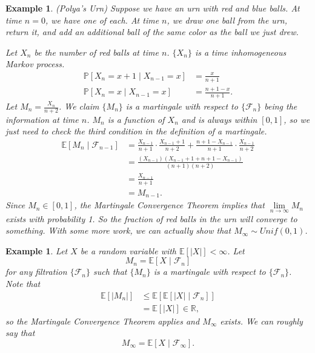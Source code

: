 \documentclass{tufte-handout}
\newcommand*\R{\mathbb{R}}
\newcommand*\E{\mathbb{E}}
\renewcommand*\P{\mathbb{P}}
\newtheorem{ex}[thm]{Example}
\theoremstyle{definition}
\begin{document}
\begin{ex}
	(Polya's Urn) Suppose we have an urn with red and blue balls. At time $n=0$, we have one of each. At time $n$, we draw one ball from the urn, return it, and add an additional ball of the same color as the ball we just drew.

	Let $X_n$ be the number of red balls at time $n$. $\{X_n\}$ is a time inhomogeneous Markov process. 
	\begin{align*}
		\P\left[X_n = x+1 \mid X_{n-1} = x\right] &= \frac{x}{n+1} \\
		\P\left[X_n = x \mid X_{n-1} = x\right] &= \frac{n+1-x}{n+1}
	.\end{align*}
	Let $M_n = \frac{X_n}{n+2}$. We claim $\{M_n\}$ is a martingale with respect to $\{\mathscr{F}_n\}$ being the information at time $n$.
	$M_n$ is a function of $X_n$ and is always within $[0,1]$, so we just need to check the third condition in the definition of a martingale.
	\begin{align*}
		\E\left[M_n \mid \mathscr{F}_{n-1}\right] &= \frac{X_{n-1}}{n+1} \cdot  \frac{X_{n-1}+1}{n+2} + \frac{n+1-X_{n-1}}{n+1} \cdot \frac{X_{n-1}}{n+2} \\
												  &= \frac{\left( X_{n-1} \right) \left( X_{n-1} + 1 + n + 1 - X_{n-1} \right)}{(n+1)(n+2)} \\
												  &= \frac{X_{n-1}}{n+1} \\
												  &= M_{n-1}
	.\end{align*}
	Since $M_n \in [0,1]$, the Martingale Convergence Theorem implies that $\lim\limits_{n \to \infty} M_n$ exists with probability 1. So the fraction of red balls in the urn will converge to something.
	With some more work, we can actually show that $M_{\infty} \sim  Unif(0,1)$.
\end{ex}

\begin{ex}
	Let $X$ be a random variable with $\E\left[\left| X \right|\right] <\infty$. Let \[
		M_n = \E\left[X \mid \mathscr{F}_n\right] 
	\] for any filtration $\{\mathscr{F}_n\}$ such that $\{M_n\}$ is a martingale with respect to $\{\mathscr{F}_n\}$. 
	Note that
	\begin{align*}
		\E\left[\left| M_n \right|\right] &\le \E\left[\E\left[\left| X \right|\mid \mathscr{F}_n\right] \right] \\
										  &= \E\left[\left| X \right|\right]  \in \R
	,\end{align*} so the Martingale Convergence Theorem applies and $M_{\infty}$ exists. We can roughly say that \[
		M_\infty = \E\left[X \mid \mathscr{F}_{\infty}\right] 
	.\] 
\end{ex}
\end{document}
